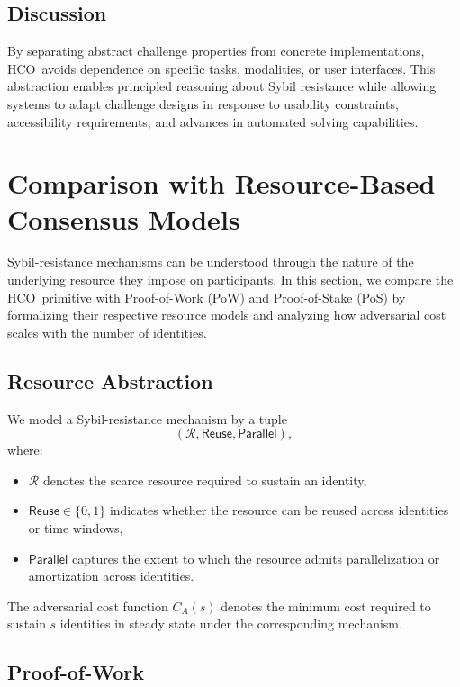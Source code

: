 \documentclass[11pt]{article}
\newcommand{\HCO}{HCO\xspace}
\begin{document}
\subsection{Discussion}

By separating abstract challenge properties from concrete implementations, \HCO\ avoids dependence on specific tasks, modalities, or user interfaces. This abstraction enables principled reasoning about Sybil resistance while allowing systems to adapt challenge designs in response to usability constraints, accessibility requirements, and advances in automated solving capabilities.

	
\section{Comparison with Resource-Based Consensus Models}
\label{sec:resource-comparison}

Sybil-resistance mechanisms can be understood through the nature of the underlying
resource they impose on participants. In this section, we compare the \HCO\ primitive
with Proof-of-Work (PoW) and Proof-of-Stake (PoS) by formalizing their respective
resource models and analyzing how adversarial cost scales with the number of identities.

\subsection{Resource Abstraction}
\label{subsec:resource-abstraction}

We model a Sybil-resistance mechanism by a tuple
\[
(\mathcal{R}, \mathsf{Reuse}, \mathsf{Parallel}),
\]
where:
\begin{itemize}
	\item $\mathcal{R}$ denotes the scarce resource required to sustain an identity,
	\item $\mathsf{Reuse} \in \{0,1\}$ indicates whether the resource can be reused
	across identities or time windows,
	\item $\mathsf{Parallel}$ captures the extent to which the resource admits
	parallelization or amortization across identities.
\end{itemize}

The adversarial cost function $C_A(s)$ denotes the minimum cost required to sustain
$s$ identities in steady state under the corresponding mechanism.

\subsection{Proof-of-Work}
\label{subsec:pow}
\end{document}
